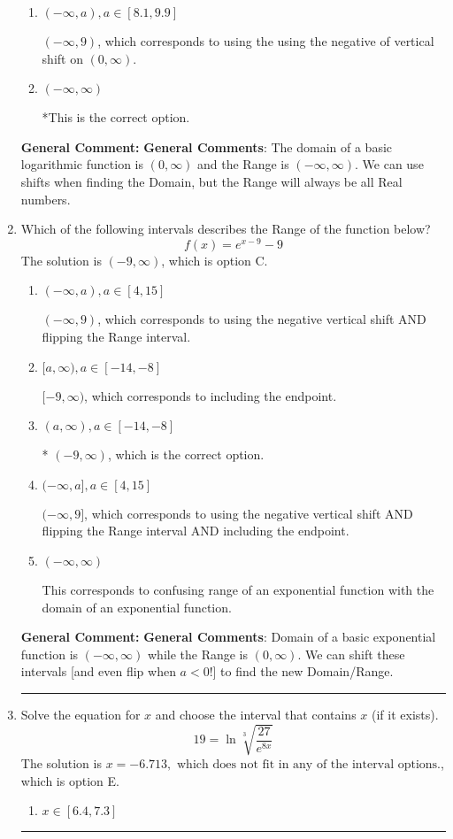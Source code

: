 \documentclass{extbook}[14pt]
\newcommand{\litem}[1]{\item #1

\rule{\textwidth}{0.4pt}}
\begin{document}
\begin{enumerate}
{\begin{enumerate}[label=\Alph*.]
$[4, \infty)$, which corresponds to using the negative of the horizontal shift AND including the endpoint.
\item \( (-\infty, a), a \in [8.1, 9.9] \)

$(-\infty, 9)$, which corresponds to using the using the negative of vertical shift on $(0, \infty)$.
\item \( (-\infty, \infty) \)

*This is the correct option.
\end{enumerate}

\textbf{General Comment:} \textbf{General Comments}: The domain of a basic logarithmic function is $(0, \infty)$ and the Range is $(-\infty, \infty)$. We can use shifts when finding the Domain, but the Range will always be all Real numbers.
}
\litem{
Which of the following intervals describes the Range of the function below?
\[ f(x) = e^{x-9}-9 \]The solution is \( (-9, \infty) \), which is option C.\begin{enumerate}[label=\Alph*.]
\item \( (-\infty, a), a \in [4, 15] \)

$(-\infty, 9)$, which corresponds to using the negative vertical shift AND flipping the Range interval.
\item \( [a, \infty), a \in [-14, -8] \)

$[-9, \infty)$, which corresponds to including the endpoint.
\item \( (a, \infty), a \in [-14, -8] \)

* $(-9, \infty)$, which is the correct option.
\item \( (-\infty, a], a \in [4, 15] \)

$(-\infty, 9]$, which corresponds to using the negative vertical shift AND flipping the Range interval AND including the endpoint.
\item \( (-\infty, \infty) \)

This corresponds to confusing range of an exponential function with the domain of an exponential function.
\end{enumerate}

\textbf{General Comment:} \textbf{General Comments}: Domain of a basic exponential function is $(-\infty, \infty)$ while the Range is $(0, \infty)$. We can shift these intervals [and even flip when $a<0$!] to find the new Domain/Range.
}
\litem{
 Solve the equation for $x$ and choose the interval that contains $x$ (if it exists).
\[  19 = \ln{\sqrt[3]{\frac{27}{e^{8x}}}} \]The solution is \( x = -6.713, \text{ which does not fit in any of the interval options.} \), which is option E.\begin{enumerate}[label=\Alph*.]
\item \( x \in [6.4, 7.3] \)


\end{enumerate}}
\end{enumerate}
\end{document}
